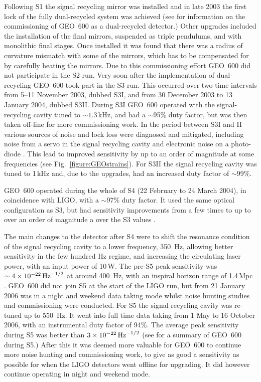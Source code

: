 \documentclass{article}
\begin{document}
Following S1 the signal recycling mirror was installed and in late 2003 the
first lock of the fully dual-recycled system was achieved (see
\cite{Smith:2004, Willke:2004, Grote:2005} for information on the commissioning
of GEO~600 as a dual-recycled detector.) Other upgrades included the
installation of the final mirrors, suspended as triple pendulums, and with
monolithic final stages. Once installed it was found that there was a radius of
curvature mismatch with some of the mirrors, which has to be compensated for by
carefully heating the mirrors. Due to this commissioning effort GEO~600 did not
participate in the S2 run. Very soon after the implementation of dual-recycling
GEO~600 took part in the S3 run. This occurred over two time intervals
from 5--11 November 2003, dubbed S3I, and from 30 December 2003 to 13 January
2004, dubbed S3II. During S3I GEO~600 operated with the signal-recycling
cavity tuned to $\sim 1.3$\,kHz, and had a $\sim$95\% duty factor, but was then
taken off-line for more commissioning work. In the period between S3I and II 
various sources of noise and lock loss were diagnosed and mitigated, including
noise from a servo in the signal recycling cavity and electronic noise on a
photo-diode \cite{Smith:2004}. This lead to improved sensitivity by up to an
order of magnitude at some frequencies (see Fig.~\ref{figure:GEOstrains}). For
S3II the signal recycling cavity was tuned to 1\,kHz and, due to the upgrades,
had an increased duty factor of $\sim$99\%.

GEO~600 operated during the whole of S4 (22 February to 24 March 2004), in 
coincidence with LIGO, with a $\sim$97\% duty factor. It used the same optical
configuration as S3, but had sensitivity improvements from a few times to up
to over an order of magnitude a over the S3 values \cite{Hild:2006a}.

The main changes to the detector after S4 were to shift the resonance condition
of the signal recycling cavity to a lower frequency, 350~Hz, allowing better
sensitivity in the few hundred Hz regime, and increasing the circulating laser
power, with an input power of 10\,W. The pre-S5 peak sensitivity was
$\sim4\times10^{-22}\,{\rm Hz}^{-1/2}$ at around 400~Hz, with an inspiral
horizon range of 1.4\,Mpc \cite{Hild:2006b}. GEO~600 did not join S5 at the
start of the LIGO run, but from 21 January 2006 was in a night and weekend data
taking mode whilst noise hunting studies and commissioning were conducted. For
S5 the signal recycling cavity was re-tuned up to 550~Hz. It went into full time
data taking from 1 May to 16 October 2006, with an instrumental duty factor of
94\%. The average peak sensitivity during S5 was better than
$3\times10^{-22}\,{\rm Hz}^{-1/2}$ (see \cite{Willke:2007} for a summary of
GEO~600 during S5.) After this it was deemed more valuable for GEO~600 to
continue more noise hunting and commissioning work, to give as good a
sensitivity as possible for when the LIGO detectors went offline for upgrading.
It did however continue operating in night and weekend mode.
\end{document}
